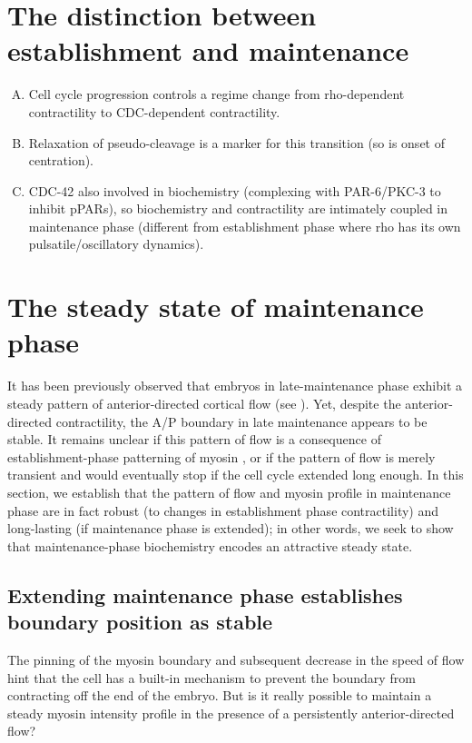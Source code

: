 \documentclass[11pt]{article}
\newcommand{\red}[1]{\color{red}#1\normalcolor}
\newcommand{\6}[1]{#1_{\text{6}}}
\newcommand{\3}[1]{#1_{\text{3}}}
\begin{document}
\section{The distinction between establishment and maintenance}


\red{
\begin{enumerate}[(A)]
 \item Cell cycle progression controls a regime change from rho-dependent contractility to CDC-dependent contractility.
\item Relaxation of pseudo-cleavage is a marker for this transition (so is onset of centration).
\item CDC-42 also involved in biochemistry (complexing with PAR-6/PKC-3 to inhibit pPARs), so biochemistry and contractility are intimately coupled in maintenance phase (different from establishment phase where rho has its own pulsatile/oscillatory dynamics). 
\end{enumerate}
}

\section{The steady state of maintenance phase }
It has been previously observed that embryos in late-maintenance phase exhibit a steady pattern of anterior-directed cortical flow (see \citep[Fig.~2]{sailer2015dynamic}). Yet, despite the anterior-directed contractility, the A/P boundary in late maintenance appears to be stable. It remains unclear if this pattern of flow is a consequence of establishment-phase patterning of myosin \citep{munro2004cortical}, or if the pattern of flow is merely transient and would eventually stop if the cell cycle extended long enough. In this section, we establish that the pattern of flow and myosin profile in maintenance phase are in fact robust (to changes in establishment phase contractility) and long-lasting (if maintenance phase is extended); in other words, we seek to show that maintenance-phase biochemistry encodes an attractive steady state. 

\subsection{Extending maintenance phase establishes boundary position as stable}
The pinning of the myosin boundary and subsequent decrease in the speed of flow hint that the cell has a built-in mechanism to prevent the boundary from contracting off the end of the embryo. But is it really possible to maintain a steady myosin intensity profile in the presence of a persistently anterior-directed flow? 
\end{document}
